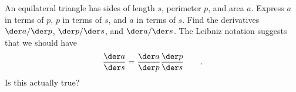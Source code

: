 An equilateral triangle has sides of length $s$, perimeter $p$, and area $a$.
Express $a$ in terms of $p$,
$p$ in terms of $s$, and
$a$ in terms of $s$.
Find the derivatives $\der a/\der p$, $\der p/\der s$, and $\der a/\der s$.
The Leibniz notation suggests that we should have
\begin{equation*}
  \frac{\der a}{\der s} = \frac{\der a}{\der p}  \frac{\der p}{\der s}   \qquad .
\end{equation*}
Is this actually true?
